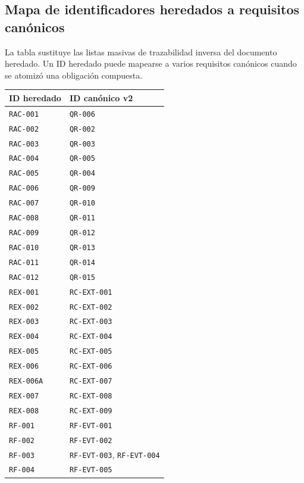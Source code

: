 \documentclass[10pt,letterpaper]{article}
\begin{document}
\subsection{Mapa de identificadores heredados a requisitos canónicos}
La tabla sustituye las listas masivas de trazabilidad inversa del documento heredado. Un ID heredado puede mapearse a varios requisitos canónicos cuando se atomizó una obligación compuesta.
\begin{longtable}{P{3.0cm}P{10.6cm}}
\toprule
\textbf{ID heredado} & \textbf{ID canónico v2}\\
\midrule

\texttt{RAC-001} & \texttt{QR-006}\\
\texttt{RAC-002} & \texttt{QR-002}\\
\texttt{RAC-003} & \texttt{QR-003}\\
\texttt{RAC-004} & \texttt{QR-005}\\
\texttt{RAC-005} & \texttt{QR-004}\\
\texttt{RAC-006} & \texttt{QR-009}\\
\texttt{RAC-007} & \texttt{QR-010}\\
\texttt{RAC-008} & \texttt{QR-011}\\
\texttt{RAC-009} & \texttt{QR-012}\\
\texttt{RAC-010} & \texttt{QR-013}\\
\texttt{RAC-011} & \texttt{QR-014}\\
\texttt{RAC-012} & \texttt{QR-015}\\
\texttt{REX-001} & \texttt{RC-EXT-001}\\
\texttt{REX-002} & \texttt{RC-EXT-002}\\
\texttt{REX-003} & \texttt{RC-EXT-003}\\
\texttt{REX-004} & \texttt{RC-EXT-004}\\
\texttt{REX-005} & \texttt{RC-EXT-005}\\
\texttt{REX-006} & \texttt{RC-EXT-006}\\
\texttt{REX-006A} & \texttt{RC-EXT-007}\\
\texttt{REX-007} & \texttt{RC-EXT-008}\\
\texttt{REX-008} & \texttt{RC-EXT-009}\\
\texttt{RF-001} & \texttt{RF-EVT-001}\\
\texttt{RF-002} & \texttt{RF-EVT-002}\\
\texttt{RF-003} & \texttt{RF-EVT-003}, \texttt{RF-EVT-004}\\
\texttt{RF-004} & \texttt{RF-EVT-005}\\

\end{longtable}
\end{document}
